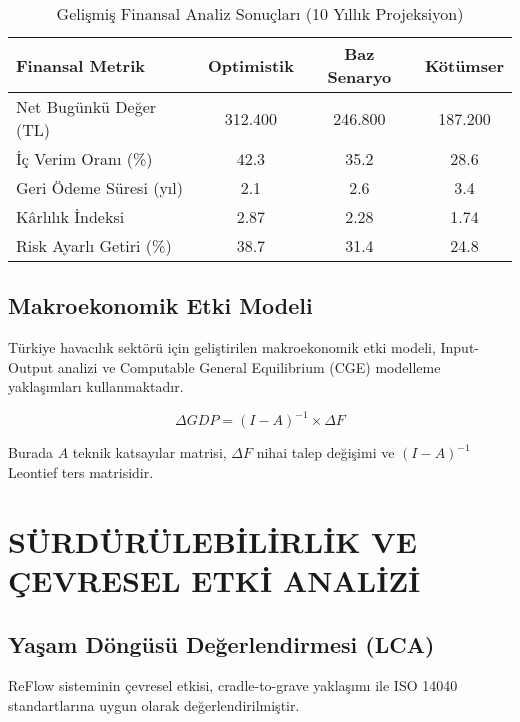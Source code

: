 \documentclass[12pt,a4paper]{article}
\begin{document}
\begin{table}[h]
\centering
\caption{Gelişmiş Finansal Analiz Sonuçları (10 Yıllık Projeksiyon)}
\begin{tabular}{lccc}
\toprule
\textbf{Finansal Metrik} & \textbf{Optimistik} & \textbf{Baz Senaryo} & \textbf{Kötümser} \\
\midrule
Net Bugünkü Değer (TL) & 312.400 & 246.800 & 187.200 \\
İç Verim Oranı (\%) & 42.3 & 35.2 & 28.6 \\
Geri Ödeme Süresi (yıl) & 2.1 & 2.6 & 3.4 \\
Kârlılık İndeksi & 2.87 & 2.28 & 1.74 \\
Risk Ayarlı Getiri (\%) & 38.7 & 31.4 & 24.8 \\
\bottomrule
\end{tabular}
\end{table}

\subsection{Makroekonomik Etki Modeli}

Türkiye havacılık sektörü için geliştirilen makroekonomik etki modeli, Input-Output analizi ve Computable General Equilibrium (CGE) modelleme yaklaşımları kullanmaktadır.

\begin{equation}
\Delta GDP = (I - A)^{-1} \times \Delta F
\end{equation}

Burada $A$ teknik katsayılar matrisi, $\Delta F$ nihai talep değişimi ve $(I - A)^{-1}$ Leontief ters matrisidir.

\section{SÜRDÜRÜLEBİLİRLİK VE ÇEVRESEL ETKİ ANALİZİ}

\subsection{Yaşam Döngüsü Değerlendirmesi (LCA)}

ReFlow sisteminin çevresel etkisi, cradle-to-grave yaklaşımı ile ISO 14040 standartlarına uygun olarak değerlendirilmiştir.
\end{document}

